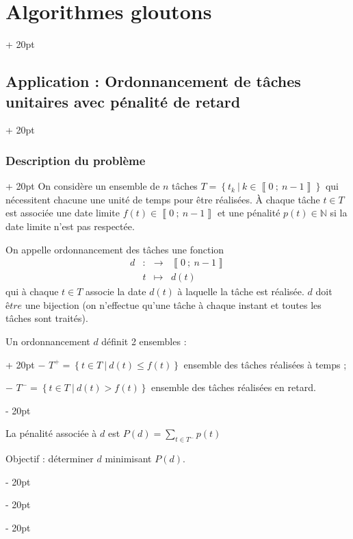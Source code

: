 \documentclass[a4paper, 12pt, twoside]{article}
\newcommand{\N}{\mathbb{N}} %
\newcommand{\nset}[2]{\left\llbracket #1\ ;\ #2 \right\rrbracket}
\newcommand{\set}[1]{\left\{ #1 \right\}}
\renewcommand{\le}{\leqslant}
\newcommand{\ind}[1][20pt]{\advance\leftskip + #1}
\newcommand{\deind}[1][20pt]{\advance\leftskip - #1}
\newenvironment{indt}[2][20pt]{#2 \par \ind[#1]}{\par \deind} %
\begin{document}
\begin{indt}{\section{Algorithmes gloutons}}
        \begin{indt}{\subsection{Application : Ordonnancement de tâches unitaires avec pénalité de retard}}
            \begin{indt}{\subsubsection{Description du problème}}
                On considère un ensemble de $n$ tâches $T = \set{t_k\ |\ k \in \nset{0}{n - 1}}$ qui nécessitent chacune une unité de temps pour être réalisées. \`A chaque tâche $t \in T$ est associée une date limite $f(t) \in \nset{0}{n - 1}$ et une pénalité $p(t) \in \N$ si la date limite n'est pas respectée.
                
                On appelle ordonnancement des tâches une fonction
                    \[
                        \begin{array}{rcccc}
                            d & : & \longrightarrow & \nset{0}{n - 1}
                            \\
                            & t & \longmapsto & d(t)
                        \end{array}
                    \]
                qui à chaque $t \in T$ associe la date $d(t)$ à laquelle la tâche est réalisée. $d$ doit $être$ une bijection (on n'effectue qu'une tâche à chaque instant et toutes les tâches sont traités).
                
                \vspace{6pt}
                
                \begin{indt}{Un ordonnancement $d$ définit 2 ensembles :}
                    $-$ $T^+ = \set{t \in T\ |\ d(t) \le f(t)}$ ensemble des tâches réalisées à temps ;
                    
                    $-$ $T^- = \set{t \in T\ |\ d(t) > f(t)}$ ensemble des tâches réalisées en retard.
                \end{indt}
                
                \vspace{6pt}
                
                La pénalité associée à $d$ est $\displaystyle P(d) = \sum_{ t \in T^-} p(t)$
                
                Objectif : déterminer $d$ minimisant $P(d)$.
                

\end{indt}
\end{indt}
\end{indt}
\end{document}
